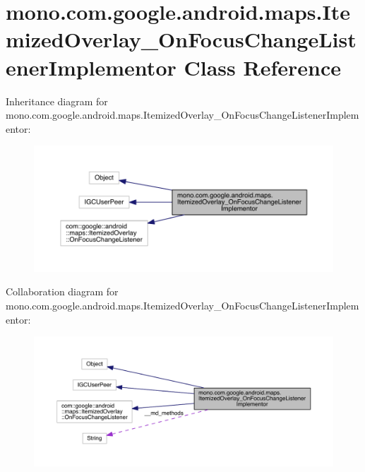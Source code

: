 \hypertarget{classmono_1_1com_1_1google_1_1android_1_1maps_1_1_itemized_overlay___on_focus_change_listener_implementor}{\section{mono.\+com.\+google.\+android.\+maps.\+Itemized\+Overlay\+\_\+\+On\+Focus\+Change\+Listener\+Implementor Class Reference}
\label{classmono_1_1com_1_1google_1_1android_1_1maps_1_1_itemized_overlay___on_focus_change_listener_implementor}
}


Inheritance diagram for mono.\+com.\+google.\+android.\+maps.\+Itemized\+Overlay\+\_\+\+On\+Focus\+Change\+Listener\+Implementor\+:
\nopagebreak
\begin{figure}[H]
\begin{center}
\leavevmode
\includegraphics[width=350pt]{classmono_1_1com_1_1google_1_1android_1_1maps_1_1_itemized_overlay___on_focus_change_listener_implementor__inherit__graph}
\end{center}
\end{figure}


Collaboration diagram for mono.\+com.\+google.\+android.\+maps.\+Itemized\+Overlay\+\_\+\+On\+Focus\+Change\+Listener\+Implementor\+:
\nopagebreak
\begin{figure}[H]
\begin{center}
\leavevmode
\includegraphics[width=350pt]{classmono_1_1com_1_1google_1_1android_1_1maps_1_1_itemized_overlay___on_focus_change_listener_implementor__coll__graph}
\end{center}
\end{figure}
